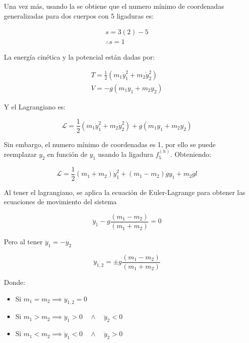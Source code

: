 \documentclass{article}
\theoremstyle{definition}
\begin{document}
Una vez más, usando la  se obtiene que el numero mínimo de coordenadas generalizadas para dos cuerpos con 5 ligaduras es:

\begin{gather}
	s = 3(2) - 5 \\
	\therefore s = 1
\end{gather}

La energía cinética y la potencial están dadas por:

\begin{gather}
	T = \frac{1}{2} \left(m_1 \dot{y}_1^2 + m_2 \dot{y}_2^2 \right) \\
	V = -g \left(m_1 y_1 + m_2 y_2 \right)
\end{gather}

Y el Lagrangiano es:

\begin{equation}
	\mathcal{L} = \frac{1}{2} \left(m_1 \dot{y}_1^2 + m_2 \dot{y}_2^2 \right) + g \left(m_1 y_1 + m_2 y_2 \right)
\end{equation}

Sin embargo, el numero mínimo de coordenadas es 1, por ello se puede reemplazar $y_2$ en función de $y_1$ usando la ligadura $f_5^{(h)}$. Obteniendo:

\begin{equation}
	\mathcal{L} = \frac{1}{2} \left(m_1 + m_2 \right) \dot{y}_1^2 + \left(m_1 - m_2 \right)g y_1 + m_2 gl
\end{equation}

Al tener el lagrangiano, se aplica la ecuación de Euler-Lagrange para obtener las ecuaciones de movimiento del sistema

\begin{equation}
	\ddot{y}_1 - g\frac{\left(m_1 - m_2 \right)}{\left(m_1 + m_2\right)} = 0
\end{equation}

Pero al tener $\ddot{y}_1 = -\ddot{y_2}$

\begin{equation}
	\ddot{y}_{1,2} = \pm g \frac{\left(m_1 - m_2 \right)}{\left(m_1 + m_2\right)}
\end{equation}

Donde:

\begin{itemize}
	\item Si $m_1 = m_2 \implies \ddot{y}_{1,2} = 0$
	\item Si $m_1 > m_2 \implies \ddot{y}_1 > 0 \quad \land \quad \ddot{y}_2 < 0$
	\item Si $m_1 < m_2 \implies \ddot{y}_1 < 0 \quad \land \quad  \ddot{y}_2 > 0$
\end{itemize}
\end{document}
